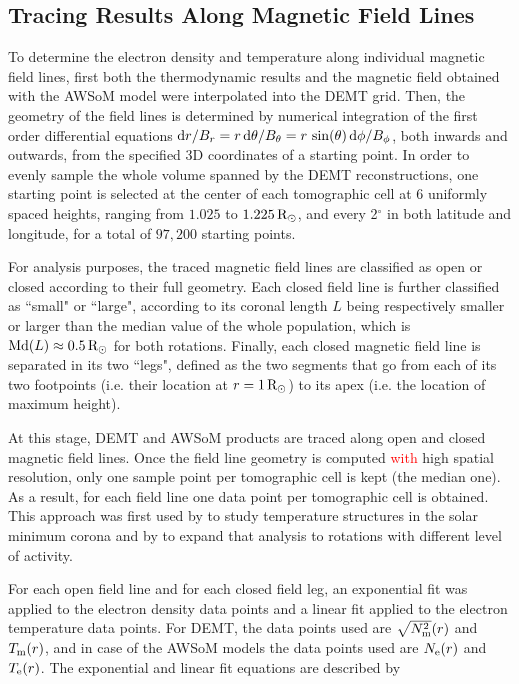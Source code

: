 \documentclass[namedreferences]{solarphysics}
\def\edit#1{\textcolor{Red}{#1}}
\newcommand{\mrsun}{{\rm R_\odot}}
\newcommand{\Te}{T_{\rm e}}
\newcommand{\Tm}{T_{\rm m}}
\newcommand{\Ne}{N_{\rm e}}
\newcommand{\Nsqm}{N^2_{{\rm m}}}
\newcommand{\sqravgN}{\sqrt{\Nsqm}}
\begin{document}
\begin{article}
\subsection{{Tracing Results Along Magnetic Field Lines}}\label{trace} 

{To determine} the electron density and temperature along individual magnetic field lines, first both the thermodynamic results and the magnetic field obtained with the AWSoM model were interpolated into the DEMT grid. Then, the geometry of the field lines is determined by numerical integration of the first order differential equations  ${\rm d}r/B_r = {r\,{\rm d}\theta}/B_\theta = r\,\sin(\theta)\,{\rm d}\phi/B_\phi$, both inwards and outwards, from the specified 3D coordinates of a starting point. In order to evenly sample the whole volume spanned by the DEMT reconstructions, one starting point is selected at the center of each tomographic cell at 6 uniformly spaced heights, ranging from $1.025$ to $1.225\,\mrsun$, and every 2$^\circ$ in both latitude and longitude, {for a total of $97,200$ starting points.}

{For analysis purposes, {the traced magnetic field lines are classified as open or closed according to their full geometry. Each closed field} line is further classified as ``small" or ``large", according to its coronal length $L$ being {respectively smaller or larger than the median value of the whole population, which is ${\rm Md}(L)\approx 0.5\,\mrsun$ for both rotations.} Finally, each closed magnetic field line is separated in its two ``legs", defined as the two segments that go from each of its two footpoints ({i.e.} their location at $r=1\,\mrsun$) to its apex ({i.e.} the location of maximum height).}

At this {stage, DEMT and AWSoM products} {are} traced along open and closed magnetic field lines. Once the field line geometry is computed \edit{with} high spatial resolution, only one sample point per tomographic cell is kept (the median one). As a result, for each field line one data point per tomographic cell {is obtained. This approach} was first used by \citet{huang_2012} to {study temperature} structures in the solar minimum {corona and by} \citet{nuevo_2013} to expand that analysis to rotations with different level of activity.

For each open field line and {for each closed field leg}, an exponential fit {was applied} to the electron density {data points} and a linear fit applied to the electron temperature {data points}. {For DEMT, the data points used are} $\sqravgN(r)$ and $\Tm(r)$, and in case of {the AWSoM models} the data points used {are} $\Ne(r)$ and $\Te(r)$. The exponential and linear fit equations are described by


\end{article}
\end{document}
